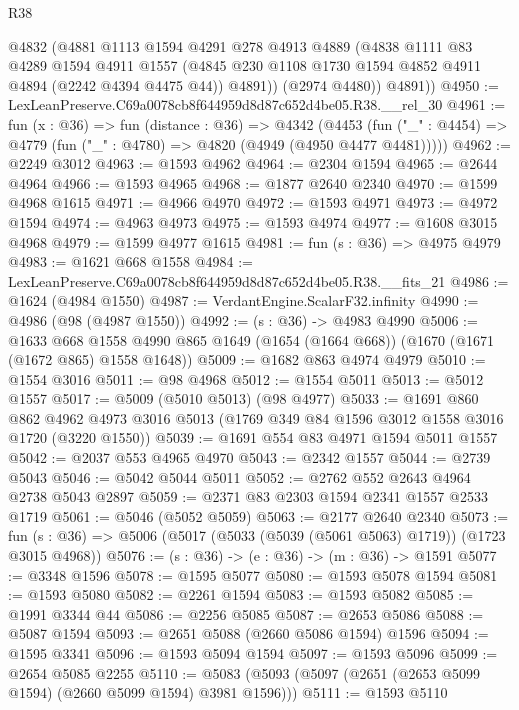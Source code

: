\begin{lexlean}{R38}
\begin{coremodule}
          @4832
          (@4881
            @1113
            @1594
            @4291
            @278
            @4913
            @4889
            (@4838
              @1111
              @83
              @4289
              @1594
              @4911
              @1557
              (@4845 @230 @1108 @1730 @1594 @4852 @4911 @4894 (@2242 @4394 @4475 @44))
              @4891))
          (@2974 @4480))
        @4891))
@4950 := LexLeanPreserve.C69a0078cb8f644959d8d87c652d4be05.R38.__rel_30
@4961 := fun (x : @36) =>
  fun (distance : @36) =>
  @4342
    (@4453 (fun ("_" : @4454) => @4779 (fun ("_" : @4780) => @4820 (@4949 (@4950 @4477 @4481)))))
@4962 := @2249 @3012
@4963 := @1593 @4962
@4964 := @2304 @1594
@4965 := @2644 @4964
@4966 := @1593 @4965
@4968 := @1877 @2640 @2340
@4970 := @1599 @4968 @1615
@4971 := @4966 @4970
@4972 := @1593 @4971
@4973 := @4972 @1594
@4974 := @4963 @4973
@4975 := @1593 @4974
@4977 := @1608 @3015 @4968
@4979 := @1599 @4977 @1615
@4981 := fun (s : @36) => @4975 @4979
@4983 := @1621 @668 @1558
@4984 := LexLeanPreserve.C69a0078cb8f644959d8d87c652d4be05.R38.__fits_21
@4986 := @1624 (@4984 @1550)
@4987 := VerdantEngine.ScalarF32.infinity
@4990 := @4986 (@98 (@4987 @1550))
@4992 := (s : @36) -> @4983 @4990
@5006 := @1633
    @668
    @1558
    @4990
    @865
    @1649
    (@1654 (@1664 @668))
    (@1670 (@1671 (@1672 @865) @1558 @1648))
@5009 := @1682 @863 @4974 @4979
@5010 := @1554 @3016
@5011 := @98 @4968
@5012 := @1554 @5011
@5013 := @5012 @1557
@5017 := @5009 (@5010 @5013) (@98 @4977)
@5033 := @1691
    @860
    @862
    @4962
    @4973
    @3016
    @5013
    (@1769 @349 @84 @1596 @3012 @1558 @3016 @1720 (@3220 @1550))
@5039 := @1691 @554 @83 @4971 @1594 @5011 @1557
@5042 := @2037 @553 @4965 @4970
@5043 := @2342 @1557
@5044 := @2739 @5043
@5046 := @5042 @5044 @5011
@5052 := @2762 @552 @2643 @4964 @2738 @5043 @2897
@5059 := @2371 @83 @2303 @1594 @2341 @1557 @2533 @1719
@5061 := @5046 (@5052 @5059)
@5063 := @2177 @2640 @2340
@5073 := fun (s : @36) => @5006 (@5017 (@5033 (@5039 (@5061 @5063) @1719)) (@1723 @3015 @4968))
@5076 := (s : @36) -> (e : @36) -> (m : @36) -> @1591
@5077 := @3348 @1596
@5078 := @1595 @5077
@5080 := @1593 @5078 @1594
@5081 := @1593 @5080
@5082 := @2261 @1594
@5083 := @1593 @5082
@5085 := @1991 @3344 @44
@5086 := @2256 @5085
@5087 := @2653 @5086
@5088 := @5087 @1594
@5093 := @2651 @5088 (@2660 @5086 @1594) @1596
@5094 := @1595 @3341
@5096 := @1593 @5094 @1594
@5097 := @1593 @5096
@5099 := @2654 @5085 @2255
@5110 := @5083 (@5093 (@5097 (@2651 (@2653 @5099 @1594) (@2660 @5099 @1594) @3981 @1596)))
@5111 := @1593 @5110

\end{coremodule}
\end{lexlean}
